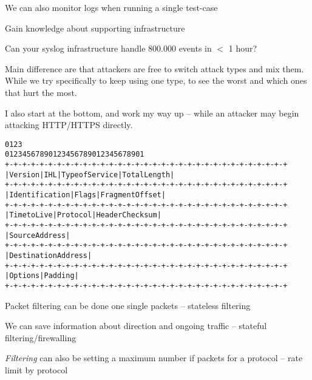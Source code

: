 \documentclass[Screen16to9,17pt]{foils}
\begin{document}
\begin{list2}
\item We can also monitor logs when running a single test-case
\item Gain knowledge about supporting infrastructure
\item Can your syslog infrastructure handle 800.000 events in $<$ 1 hour?
\end{list2}

Main difference are that attackers are free to switch attack types and mix them. While we try specifically to keep using one type, to see the worst and which ones that hurt the most.

I also start at the bottom, and work my way up -- while an attacker may begin attacking HTTP/HTTPS directly.







\begin{alltt}\footnotesize
0                   1                   2                   3
0 1 2 3 4 5 6 7 8 9 0 1 2 3 4 5 6 7 8 9 0 1 2 3 4 5 6 7 8 9 0 1
+-+-+-+-+-+-+-+-+-+-+-+-+-+-+-+-+-+-+-+-+-+-+-+-+-+-+-+-+-+-+-+-+
|Version|  IHL  |Type of Service|          Total Length         |
+-+-+-+-+-+-+-+-+-+-+-+-+-+-+-+-+-+-+-+-+-+-+-+-+-+-+-+-+-+-+-+-+
|         Identification        |Flags|      Fragment Offset    |
+-+-+-+-+-+-+-+-+-+-+-+-+-+-+-+-+-+-+-+-+-+-+-+-+-+-+-+-+-+-+-+-+
|  Time to Live |    Protocol   |         Header Checksum       |
+-+-+-+-+-+-+-+-+-+-+-+-+-+-+-+-+-+-+-+-+-+-+-+-+-+-+-+-+-+-+-+-+
|                       Source Address                          |
+-+-+-+-+-+-+-+-+-+-+-+-+-+-+-+-+-+-+-+-+-+-+-+-+-+-+-+-+-+-+-+-+
|                    Destination Address                        |
+-+-+-+-+-+-+-+-+-+-+-+-+-+-+-+-+-+-+-+-+-+-+-+-+-+-+-+-+-+-+-+-+
|                    Options                    |    Padding    |
+-+-+-+-+-+-+-+-+-+-+-+-+-+-+-+-+-+-+-+-+-+-+-+-+-+-+-+-+-+-+-+-+
\end{alltt}

\begin{list2}
\item Packet filtering can be done one single packets -- stateless filtering
\item We can save information about direction and ongoing traffic -- stateful filtering/firewalling
\item \emph{Filtering} can also be setting a maximum number if packets for a protocol -- rate limit by protocol
\end{list2}
\end{document}
